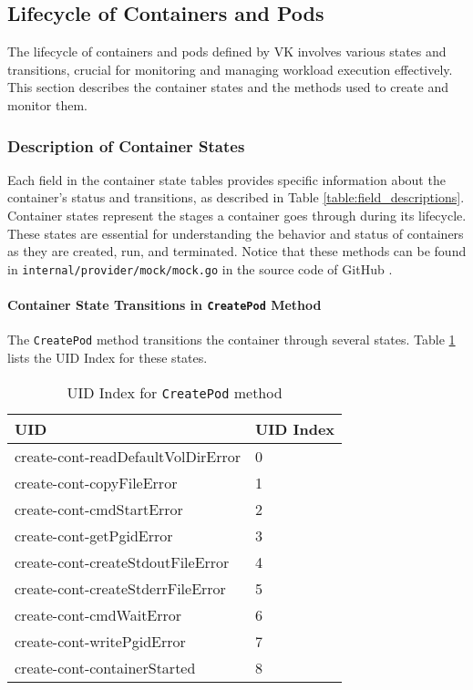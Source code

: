 \subsection{Lifecycle of Containers and Pods}
\label{lifecycle}

The lifecycle of containers and pods defined by VK involves various states and transitions, crucial for monitoring and managing workload execution effectively. This section describes the container states and the methods used to create and monitor them.

\subsubsection{Description of Container States}

Each field in the container state tables provides specific information about the container's status and transitions, as described in Table \ref{table:field_descriptions}. Container states represent the stages a container goes through during its lifecycle. These states are essential for understanding the behavior and status of containers as they are created, run, and terminated. Notice that these methods can be found in \texttt{internal/provider/mock/mock.go} in the source code of GitHub \cite{virtual-kubelet-cmd}.

\paragraph{Container State Transitions in \texttt{CreatePod} Method}

The \texttt{CreatePod} method transitions the container through several states. Table \ref{table:uid_index_createpod} lists the UID Index for these states.

\begin{table}[h!]
\centering
\caption{UID Index for \texttt{CreatePod} method}
\label{table:uid_index_createpod}
\begin{tabular}{|l|l|}
\hline
\textbf{UID} & \textbf{UID Index} \\
\hline
create-cont-readDefaultVolDirError & 0 \\
\hline
create-cont-copyFileError & 1 \\
\hline
create-cont-cmdStartError & 2 \\
\hline
create-cont-getPgidError & 3 \\
\hline
create-cont-createStdoutFileError & 4 \\
\hline
create-cont-createStderrFileError & 5 \\
\hline
create-cont-cmdWaitError & 6 \\
\hline
create-cont-writePgidError & 7 \\
\hline
create-cont-containerStarted & 8 \\
\hline
\end{tabular}
\end{table}

